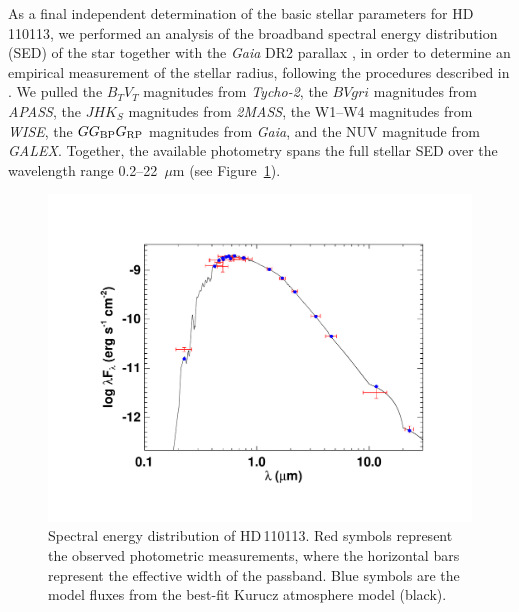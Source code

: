 \documentclass[fleqn,usenatbib]{mnras}
\newcommand{\Tstar}{HD\,110113}
\begin{document}
As a final independent determination of the basic stellar parameters for \Tstar, we performed an analysis of the broadband spectral energy distribution (SED) of the star together with the {\it Gaia\/} DR2 parallax \citep[adjusted by $+0.08$~mas to account for the systematic offset reported by][]{StassunTorres:2018}, in order to determine an empirical measurement of the stellar radius, following the procedures described in \citet{Stassun:2016,Stassun:2017,Stassun:2018}. We pulled the $B_T V_T$ magnitudes from {\it Tycho-2}, the $BVgri$ magnitudes from {\it APASS}, the $JHK_S$ magnitudes from {\it 2MASS}, the W1--W4 magnitudes from {\it WISE}, the $G G_{\rm BP} G_{\rm RP}$ magnitudes from {\it Gaia}, and the NUV magnitude from {\it GALEX}. Together, the available photometry spans the full stellar SED over the wavelength range 0.2--22~$\mu$m (see Figure~\ref{fig:sed}).  

\begin{figure}
    \centering
    \includegraphics[width=\linewidth,trim=100 75 95 95,clip]{toi_755_sed.pdf}
    \caption{Spectral energy distribution of \Tstar. Red symbols represent the observed photometric measurements, where the horizontal bars represent the effective width of the passband. Blue symbols are the model fluxes from the best-fit Kurucz atmosphere model (black).}
    \label{fig:sed}
\end{figure}
\end{document}
